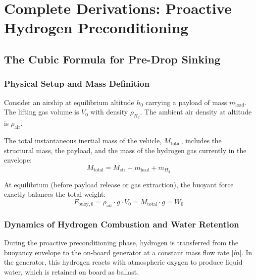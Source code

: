 
\section{Complete Derivations: Proactive Hydrogen Preconditioning}
\label{sec:appendixA}

\subsection{The Cubic Formula for Pre-Drop Sinking}
\label{appx:cubic_formula}

\subsubsection{Physical Setup and Mass Definition}

Consider an airship at equilibrium altitude $h_0$ carrying a payload of mass $m_{\text{load}}$.
The lifting gas volume is $V_0$ with density $\rho_{H_2}$.
The ambient air density at altitude is $\rho_{\text{air}}$.

The total instantaneous inertial mass of the vehicle, $M_{\text{total}}$, includes the structural mass, the payload, and the mass of the hydrogen gas currently in the envelope:
\begin{equation}
  M_{\text{total}} = M_{\text{str}} + m_{\text{load}} + m_{H_2}
\end{equation}

At equilibrium (before payload release or gas extraction), the buoyant force exactly balances the total weight:
\begin{equation}
  F_{\text{buoy},0} = \rho_{\text{air}} \cdot g \cdot V_0 = M_{\text{total}} \cdot g = W_0
\end{equation}

\subsubsection{Dynamics of Hydrogen Combustion and Water Retention}

During the proactive preconditioning phase, hydrogen is transferred from the buoyancy envelope to the on-board generator at a constant mass flow rate $|\dot{m}|$.
In the generator, this hydrogen reacts with atmospheric oxygen to produce liquid water, which is retained on board as ballast.

